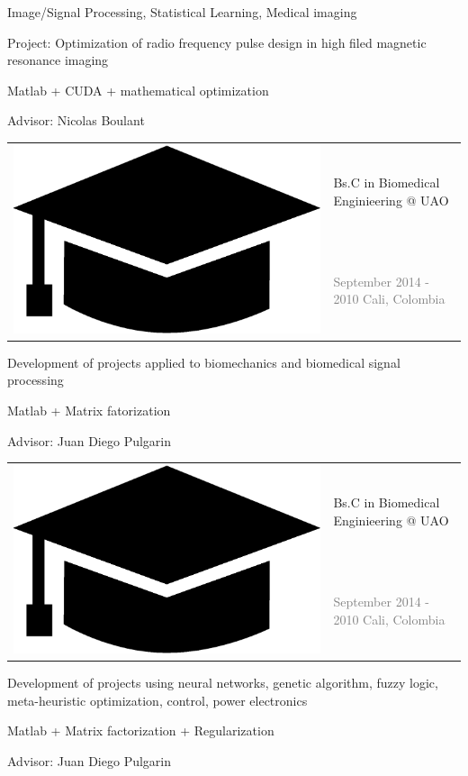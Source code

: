 \documentclass[letterpaper]{article}
\begin{document}
\begin{minipage}[t]{1.\linewidth}
\begin{minipage}{0.47\linewidth}
\begin{minipage}{1\linewidth}
		{\small Image/Signal Processing, Statistical Learning, Medical imaging
		
		\smallskip
		\textmd{Project:} Optimization of radio frequency pulse design in high 
		filed magnetic resonance imaging
		
		\smallskip
		Matlab + CUDA + mathematical optimization
		
		\smallskip
		\textmd{Advisor:} Nicolas Boulant}
	\end{minipage} %
	\begin{minipage}{1\linewidth} %
		\vspace{4ex}
		\begin{tabularx}{1\textwidth}{rX}				
			\multirow{2}{*}{\includegraphics[trim= 0.1cm 0.1cm 0.1cm 0.1cm,	
			clip=true, width=0.12\linewidth]{hat.eps}} & {\large Bs.C in 
			Biomedical Enginieering @ UAO}\\
			& {\small\textcolor{gray}{September 2014 - 2010 \hfill Cali, 
			Colombia}}\\
		\end{tabularx}
		\vspace{0.1cm}
		
		{\small Development of projects applied to biomechanics and biomedical 
		signal processing
		
		\smallskip
		Matlab + Matrix fatorization
		
		\smallskip
		\textmd{Advisor:} Juan Diego Pulgarin}
	\end{minipage} %
	\begin{minipage}{1\linewidth} %
		\vspace{4ex}
		\begin{tabularx}{1\textwidth}{rX}				
			\multirow{2}{*}{\includegraphics[trim= 0.1cm 0.1cm 0.1cm 0.1cm, 
			clip=true, width=0.12\linewidth]{hat.eps}} & {\large Bs.C in 
			Biomedical Enginieering @ UAO}\\
			& {\small\textcolor{gray}{September 2014 - 2010 \hfill Cali, 
			Colombia}}
		\end{tabularx}
		\vspace{0.1ex}
		
		{\small Development of projects using neural networks, genetic 
		algorithm, fuzzy logic, meta-heuristic optimization, control, power 
		electronics
				
		\smallskip
		Matlab + Matrix factorization + Regularization
		
		\smallskip
		\textmd{Advisor:} Juan Diego Pulgarin}\\
	\end{minipage} %
\end{minipage}
\end{minipage}\\
\end{document}
